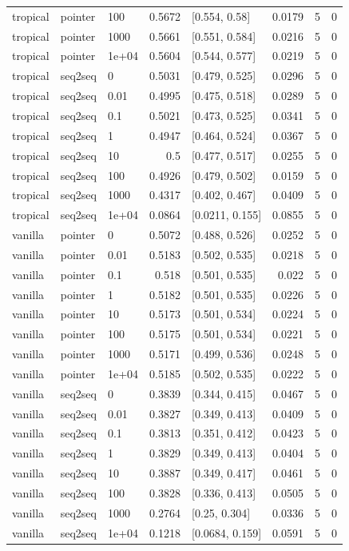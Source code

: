 \documentclass[10pt]{article}
\begin{document}
{\begin{longtable}{lllrlrrr}
tropical & pointer & 100 & 0.5672 & [0.554, 0.58] & 0.0179 & 5 & 0\\
tropical & pointer & 1000 & 0.5661 & [0.551, 0.584] & 0.0216 & 5 & 0\\
tropical & pointer & 1e+04 & 0.5604 & [0.544, 0.577] & 0.0219 & 5 & 0\\
tropical & seq2seq & 0 & 0.5031 & [0.479, 0.525] & 0.0296 & 5 & 0\\
tropical & seq2seq & 0.01 & 0.4995 & [0.475, 0.518] & 0.0289 & 5 & 0\\
tropical & seq2seq & 0.1 & 0.5021 & [0.473, 0.525] & 0.0341 & 5 & 0\\
tropical & seq2seq & 1 & 0.4947 & [0.464, 0.524] & 0.0367 & 5 & 0\\
tropical & seq2seq & 10 & 0.5 & [0.477, 0.517] & 0.0255 & 5 & 0\\
tropical & seq2seq & 100 & 0.4926 & [0.479, 0.502] & 0.0159 & 5 & 0\\
tropical & seq2seq & 1000 & 0.4317 & [0.402, 0.467] & 0.0409 & 5 & 0\\
tropical & seq2seq & 1e+04 & 0.0864 & [0.0211, 0.155] & 0.0855 & 5 & 0\\
vanilla & pointer & 0 & 0.5072 & [0.488, 0.526] & 0.0252 & 5 & 0\\
vanilla & pointer & 0.01 & 0.5183 & [0.502, 0.535] & 0.0218 & 5 & 0\\
vanilla & pointer & 0.1 & 0.518 & [0.501, 0.535] & 0.022 & 5 & 0\\
vanilla & pointer & 1 & 0.5182 & [0.501, 0.535] & 0.0226 & 5 & 0\\
vanilla & pointer & 10 & 0.5173 & [0.501, 0.534] & 0.0224 & 5 & 0\\
vanilla & pointer & 100 & 0.5175 & [0.501, 0.534] & 0.0221 & 5 & 0\\
vanilla & pointer & 1000 & 0.5171 & [0.499, 0.536] & 0.0248 & 5 & 0\\
vanilla & pointer & 1e+04 & 0.5185 & [0.502, 0.535] & 0.0222 & 5 & 0\\
vanilla & seq2seq & 0 & 0.3839 & [0.344, 0.415] & 0.0467 & 5 & 0\\
vanilla & seq2seq & 0.01 & 0.3827 & [0.349, 0.413] & 0.0409 & 5 & 0\\
vanilla & seq2seq & 0.1 & 0.3813 & [0.351, 0.412] & 0.0423 & 5 & 0\\
vanilla & seq2seq & 1 & 0.3829 & [0.349, 0.413] & 0.0404 & 5 & 0\\
vanilla & seq2seq & 10 & 0.3887 & [0.349, 0.417] & 0.0461 & 5 & 0\\
vanilla & seq2seq & 100 & 0.3828 & [0.336, 0.413] & 0.0505 & 5 & 0\\
vanilla & seq2seq & 1000 & 0.2764 & [0.25, 0.304] & 0.0336 & 5 & 0\\
vanilla & seq2seq & 1e+04 & 0.1218 & [0.0684, 0.159] & 0.0591 & 5 & 0\\
\bottomrule
\end{longtable}
}
\end{document}
